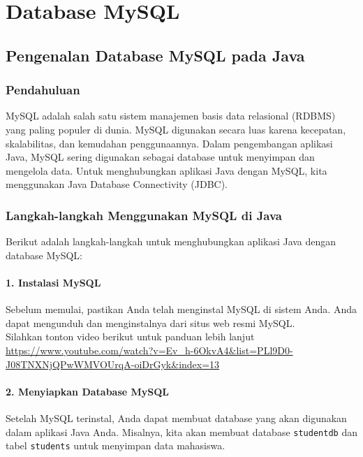 \chapter{Database MySQL}

\section{Pengenalan Database MySQL pada Java}

\subsection{Pendahuluan}

MySQL adalah salah satu sistem manajemen basis data relasional (RDBMS) yang paling populer di dunia. MySQL digunakan secara luas karena kecepatan, skalabilitas, dan kemudahan penggunaannya. Dalam pengembangan aplikasi Java, MySQL sering digunakan sebagai database untuk menyimpan dan mengelola data. Untuk menghubungkan aplikasi Java dengan MySQL, kita menggunakan Java Database Connectivity (JDBC).

\subsection{Langkah-langkah Menggunakan MySQL di Java}

Berikut adalah langkah-langkah untuk menghubungkan aplikasi Java dengan database MySQL:

\subsubsection{1. Instalasi MySQL}

Sebelum memulai, pastikan Anda telah menginstal MySQL di sistem Anda. Anda dapat mengunduh dan menginstalnya dari situs web resmi MySQL.\\

Silahkan tonton video berikut untuk panduan lebih lanjut\\ \url{https://www.youtube.com/watch?v=Ev_h-6OkvA4&list=PLl9D0-J08TNXNjQPwWMVOUrqA-oiDrGyk&index=13}

\subsubsection{2. Menyiapkan Database MySQL}

Setelah MySQL terinstal, Anda dapat membuat database yang akan digunakan dalam aplikasi Java Anda. Misalnya, kita akan membuat database \texttt{studentdb} dan tabel \texttt{students} untuk menyimpan data mahasiswa. 

